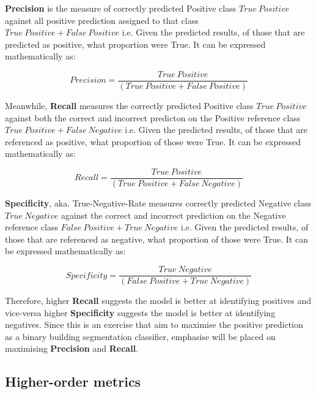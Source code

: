 \documentclass[11pt, a4paper, twoside]{report}
\begin{document}
\textbf{Precision} is the measure of correctly predicted Positive class $True\ Positive$ against all positive prediction assigned to that class $True\ Positive + False\ Positive$ i.e. Given the predicted results, of those that are predicted as positive, what proportion were True. It can be expressed mathematically as:

\begin{equation}
  Precision = \frac{True\ Positive} {(True\ Positive + False\ Positive)}
\end{equation}

Meanwhile, \textbf{Recall} measures the correctly predicted Positive class $True\ Positive$ against both the correct and incorrect predicton on the Positive reference class $True\ Positive + False\ Negative$ i.e. Given the predicted results, of those that are referenced as positive, what proportion of those were True. It can be expressed mathematically as:

\begin{equation}
  Recall = \frac{True\ Positive} {(True\ Positive + False\ Negative)}
\end{equation}

\textbf{Specificity}, aka. True-Negative-Rate measures correctly predicted Negative class $True\ Negative$ against the correct and incorrect prediction on the Negative reference class $False\ Positive + True\ Negative$ i.e. Given the predicted results, of those that are referenced as negative, what proportion of those were True. It can be expressed mathematically as:

\begin{equation}
  Specificity = \frac{True\ Negative} {(False\ Positive + True\ Negative)}
\end{equation}

Therefore, higher \textbf{Recall} suggests the model is better at identifying positives and vice-versa higher \textbf{Specificity} suggests the model is better at identifying negatives. Since this is an exercise that aim to maximise the positive prediction as a binary building segmentation classifier, emphasise will be placed on maximising \textbf{Precision} and \textbf{Recall}.\\\par

\subsection{Higher-order metrics}\label{2ndorder}
\end{document}
